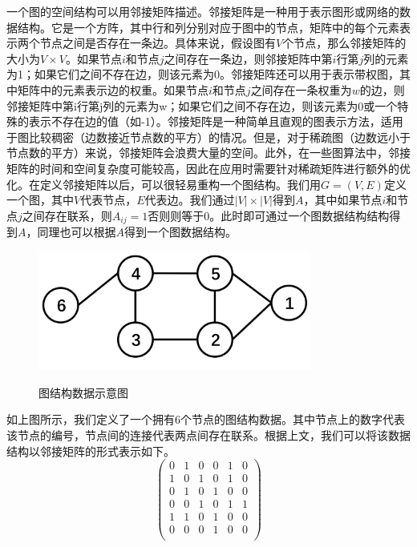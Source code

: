 一个图的空间结构可以用邻接矩阵描述。邻接矩阵是一种用于表示图形或网络的数据结构。它是一个方阵，其中行和列分别对应于图中的节点，矩阵中的每个元素表示两个节点之间是否存在一条边。具体来说，假设图有$V$个节点，那么邻接矩阵的大小为$V \times V$。如果节点$i$和节点$j$之间存在一条边，则邻接矩阵中第$i$行第$j$列的元素为1；如果它们之间不存在边，则该元素为0。邻接矩阵还可以用于表示带权图，其中矩阵中的元素表示边的权重。如果节点$i$和节点$j$之间存在一条权重为$w$的边，则邻接矩阵中第i行第j列的元素为w；如果它们之间不存在边，则该元素为0或一个特殊的表示不存在边的值（如-1）。邻接矩阵是一种简单且直观的图表示方法，适用于图比较稠密（边数接近节点数的平方）的情况。但是，对于稀疏图（边数远小于节点数的平方）来说，邻接矩阵会浪费大量的空间。此外，在一些图算法中，邻接矩阵的时间和空间复杂度可能较高，因此在应用时需要针对稀疏矩阵进行额外的优化。在定义邻接矩阵以后，可以很轻易重构一个图结构。我们用$G=(V,E)$定义一个图，其中$V$代表节点，$E$代表边。我们通过$\left|V\right| \times \left|V\right|$得到$A$，其中如果节点$i$和节点$j$之间存在联系，则$A_{ij}=1$否则则等于0。此时即可通过一个图数据结构结构得到$A$，同理也可以根据$A$得到一个图数据结构。
\begin{figure}[ht]
    \centering
    \includegraphics[width=0.80\textwidth]{FigMa/Graph_structure.png}\\
    \vspace{-0.3cm}
    \caption{图结构数据示意图}
    \label{fig:Graph_structure}
\end{figure}
如上图所示，我们定义了一个拥有6个节点的图结构数据。其中节点上的数字代表该节点的编号，节点间的连接代表两点间存在联系。根据上文，我们可以将该数据结构以邻接矩阵的形式表示如下。
\begin{equation}
\begin{pmatrix}
        0 & 1 & 0 & 0 & 1 & 0 \\
        1 & 0 & 1 & 0 & 1 & 0 \\
        0 & 1 & 0 & 1 & 0 & 0 \\
        0 & 0 & 1 & 0 & 1 & 1 \\
        1 & 1 & 0 & 1 & 0 & 0 \\
        0 & 0 & 0 & 1 & 0 & 0 \\
\end{pmatrix}
\label{equation:adj_mat}
\end{equation}
